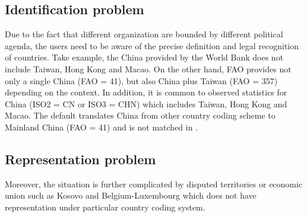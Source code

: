 \documentclass[nojss]{jss}\usepackage[]{graphicx}\usepackage[]{color}
\begin{document}
\subsection{Identification problem}
Due to the fact that different organization are bounded by different political agenda, the users need to be aware of the precise definition and legal recognition of countries. Take example, the China provided by the World Bank does not include Taiwan, Hong Kong and Macao. On the other hand, FAO provides not only a single China (FAO = 41), but also China plus Taiwan (FAO = 357) depending on the context. In addition, it is common to observed statistics for China (ISO2 = CN or ISO3 = CHN) which includes Taiwan, Hong Kong and Macao. The default translates China from other country coding scheme to Mainland China (FAO = 41) and is not matched in .

\subsection{Representation problem}
Moreover, the situation is further complicated by disputed territories or economic union such as Kosovo and Belgium-Luxembourg which does not have representation under particular country coding system. 
\end{document}
